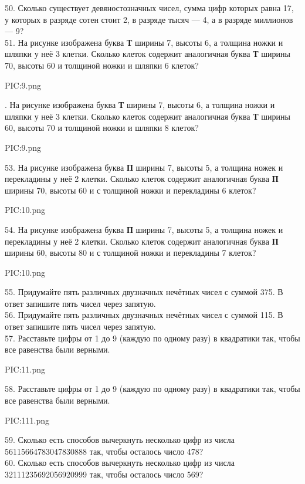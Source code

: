 50. Сколько существует девяностозначных чисел, сумма цифр которых равна 17, у которых в разряде сотен стоит 2, в разряде тысяч --- 4, а в разряде миллионов --- 9?\\
51. На рисунке изображена буква {\bf Т} ширины 7, высоты 6, а толщина ножки и шляпки у неё 3 клетки. Сколько клеток содержит аналогичная буква {\bf Т} ширины 70, высоты 60 и толщиной ножки и шляпки 6 клеток?
\begin{center}
{{PIC:9.png}}
\end{center}
\newpage
{}. На рисунке изображена буква {\bf Т} ширины 7, высоты 6, а толщина ножки и шляпки у неё 3 клетки. Сколько клеток содержит аналогичная буква {\bf Т} ширины 60, высоты 70 и толщиной ножки и шляпки 8 клеток?
\begin{center}
{{PIC:9.png}}
\end{center}
53. На рисунке изображена буква {\bf П} ширины 7, высоты 5, а толщина ножек и перекладины у неё 2 клетки. Сколько клеток содержит аналогичная буква {\bf П} ширины 70, высоты 60 и с толщиной ножки и перекладины 6 клеток?
\begin{center}
{{PIC:10.png}}
\end{center}
54. На рисунке изображена буква {\bf П} ширины 7, высоты 5, а толщина ножек и перекладины у неё 2 клетки. Сколько клеток содержит аналогичная буква {\bf П} ширины 60, высоты 80 и с толщиной ножки и перекладины 7 клеток?
\begin{center}
{{PIC:10.png}}
\end{center}
55. Придумайте пять различных двузначных нечётных чисел с суммой 375. В ответ запишите пять чисел через запятую.\\
56. Придумайте пять различных двузначных нечётных чисел с суммой 115. В ответ запишите пять чисел через запятую.\\
57. Расставьте цифры от 1 до 9 (каждую по одному разу) в квадратики так, чтобы все равенства были верными.
\begin{center}
{{PIC:11.png}}
\end{center}
58. Расставьте цифры от 1 до 9 (каждую по одному разу) в квадратики так, чтобы все равенства были верными.
\begin{center}
{{PIC:111.png}}
\end{center}
59. Сколько есть способов вычеркнуть несколько цифр из числа 56115664783047830888 так, чтобы осталось число 478?\\
60. Сколько есть способов вычеркнуть несколько цифр из числа 32111235692056920999 так, чтобы осталось число 569?\\
